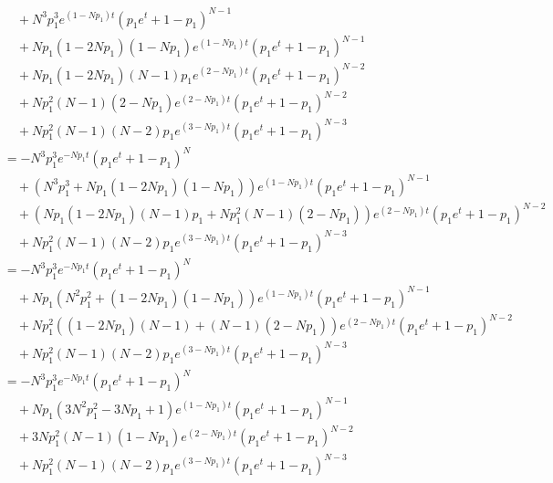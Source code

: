 \documentclass[dvipdfmx]{jsarticle}
\begin{document}
\begin{align}
  &\quad+N^3p_1^3e^{\left(1-Np_1\right)t}\left(p_1e^t+1-p_1\right)^{N-1}\nonumber\\
  &\quad+Np_1\left(1-2Np_1\right)\left(1-Np_1\right)e^{\left(1-Np_1\right)t}\left(p_1e^t+1-p_1\right)^{N-1}\nonumber\\
  &\quad+Np_1\left(1-2Np_1\right)\left(N-1\right)p_1e^{\left(2-Np_1\right)t}\left(p_1e^t+1-p_1\right)^{N-2}\nonumber\\
  &\quad+Np_1^2\left(N-1\right)\left(2-Np_1\right)e^{\left(2-Np_1\right)t}\left(p_1e^t+1-p_1\right)^{N-2}\nonumber\\
  &\quad+Np_1^2\left(N-1\right)\left(N-2\right)p_1e^{\left(3-Np_1\right)t}\left(p_1e^t+1-p_1\right)^{N-3}\nonumber\\
  &=-N^3p_1^3e^{-Np_1t}\left(p_1e^t+1-p_1\right)^N\nonumber\\
  &\quad+\left(N^3p_1^3+Np_1\left(1-2Np_1\right)\left(1-Np_1\right)\right)e^{\left(1-Np_1\right)t}\left(p_1e^t+1-p_1\right)^{N-1}\nonumber\\
  &\quad+\left(Np_1\left(1-2Np_1\right)\left(N-1\right)p_1+Np_1^2\left(N-1\right)\left(2-Np_1\right)\right)e^{\left(2-Np_1\right)t}\left(p_1e^t+1-p_1\right)^{N-2}\nonumber\\
  &\quad+Np_1^2\left(N-1\right)\left(N-2\right)p_1e^{\left(3-Np_1\right)t}\left(p_1e^t+1-p_1\right)^{N-3}\nonumber\\
  &=-N^3p_1^3e^{-Np_1t}\left(p_1e^t+1-p_1\right)^N\nonumber\\
  &\quad+Np_1\left(N^2p_1^2+\left(1-2Np_1\right)\left(1-Np_1\right)\right)e^{\left(1-Np_1\right)t}\left(p_1e^t+1-p_1\right)^{N-1}\nonumber\\
  &\quad+Np_1^2\left(\left(1-2Np_1\right)\left(N-1\right)+\left(N-1\right)\left(2-Np_1\right)\right)e^{\left(2-Np_1\right)t}\left(p_1e^t+1-p_1\right)^{N-2}\nonumber\\
  &\quad+Np_1^2\left(N-1\right)\left(N-2\right)p_1e^{\left(3-Np_1\right)t}\left(p_1e^t+1-p_1\right)^{N-3}\nonumber\\
  &=-N^3p_1^3e^{-Np_1t}\left(p_1e^t+1-p_1\right)^N\nonumber\\
  &\quad+Np_1\left(3N^2p_1^2-3Np_1+1\right)e^{\left(1-Np_1\right)t}\left(p_1e^t+1-p_1\right)^{N-1}\nonumber\\
  &\quad+3Np_1^2\left(N-1\right)\left(1-Np_1\right)e^{\left(2-Np_1\right)t}\left(p_1e^t+1-p_1\right)^{N-2}\nonumber\\
  &\quad+Np_1^2\left(N-1\right)\left(N-2\right)p_1e^{\left(3-Np_1\right)t}\left(p_1e^t+1-p_1\right)^{N-3}\nonumber\\
 \end{align}
\end{document}
